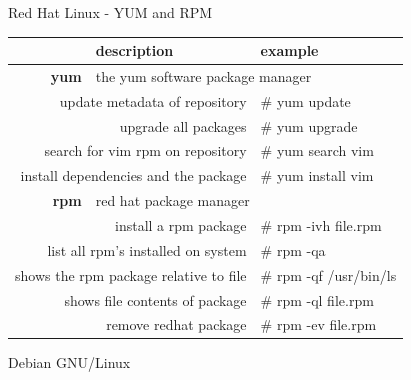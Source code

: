 \documentclass{beamer}
\begin{document}
\begin{frame}[t]
{\begin{minipage}[t]{.50\linewidth}
        \begin{minipage}[t]{0.475\textwidth}
        \begin{alertblock}{Red Hat Linux - YUM and RPM}
            \vspace{10pt}
            \centering
            \parbox{.95\textwidth}{
            \begin{tabular}{r | p{} p{} }
                \textbf{} & \textbf{\large description} & \textbf{\large example}\\
                \hline
                \textbf{yum} & \multicolumn{2}{l}{the yum software package manager} \\
                \multicolumn{2}{r}{update metadata of repository} & \# yum update\\
                \multicolumn{2}{r}{upgrade all packages} & \# yum upgrade\\
                \multicolumn{2}{r}{search for vim rpm on repository} & \# yum search vim\\
                \multicolumn{2}{r}{install dependencies and the package} & \# yum install vim\\
                \textbf{rpm} & \multicolumn{2}{l}{red hat package manager}\\
                \multicolumn{2}{r}{install a rpm package} & \# rpm -ivh file.rpm\\
                \multicolumn{2}{r}{list all rpm's installed on system} & \# rpm -qa\\
                \multicolumn{2}{r}{shows the rpm package relative to file} & \# rpm -qf /usr/bin/ls\\
                \multicolumn{2}{r}{shows file contents of package} & \# rpm -ql file.rpm\\
                \multicolumn{2}{r}{remove redhat package} & \# rpm -ev file.rpm\\
            \end{tabular}
            \vspace{20pt}
            }
        \end{alertblock}
        \end{minipage}
        \begin{minipage}[t]{0.045\textwidth}
            \hspace{\fill}
        \end{minipage}
        \begin{minipage}[t]{0.475\textwidth}
        \begin{exampleblock}{Debian GNU/Linux}

\end{exampleblock}
\end{minipage}
\end{minipage}}
\end{frame}
\end{document}
